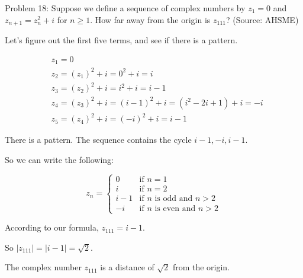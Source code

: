 Problem 18: Suppose we define a sequence of complex numbers by $z_1 = 0$ and $z_{n + 1} = z_n^2 + i$ for $n \ge 1$. How far away from the origin is $z_{111}$? (Source: AHSME)

Let's figure out the first five terms, and see if there is a pattern.

\begin{align*}
& z_1 = 0 \\
& z_2 = (z_{1})^2 + i = 0^2 + i = i \\
& z_3 = (z_{2})^2 + i = i^2 + i = i - 1 \\
& z_4 = (z_{3})^2 + i = (i - 1)^2 + i = (i^2 - 2i + 1) + i = -i \\
& z_5 = (z_4)^2 + i = (-i)^2 + i = i - 1
\end{align*}

There is a pattern. The sequence contains the cycle $i - 1, -i, i - 1$.

So we can write the following:

\[
z_{n} = 
\begin{cases}
0 & \text{if $n = 1$} \\
i & \text{if $n = 2$} \\
i - 1 & \text{if $n$ is odd and $n > 2$} \\
-i & \text{if $n$ is even and $n > 2$}
\end{cases}
\]

According to our formula, $z_{111} = i - 1$.

So $|z_{111}| = |i - 1| = \sqrt{2}$.

The complex number $z_{111}$ is a distance of $\boxed{\sqrt{2}}$ from the origin.
